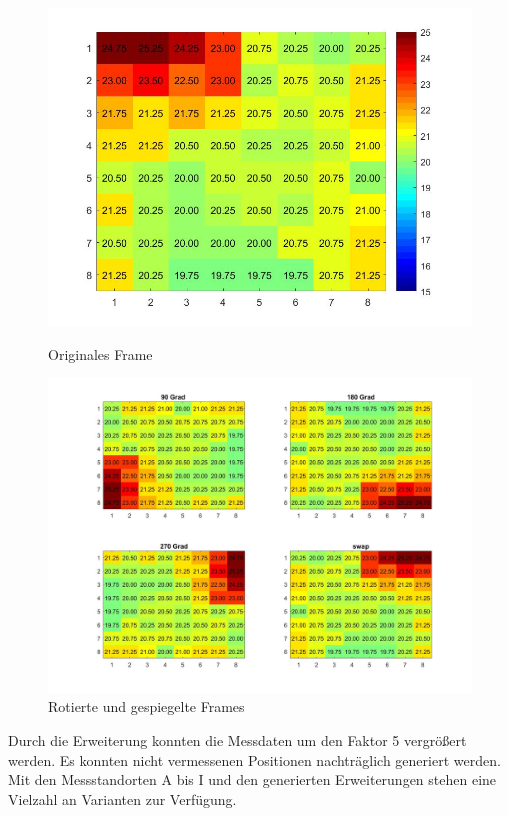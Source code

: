 \begin{figure}[!ht]
	\centering
	\begin{minipage}[c]{0.35\linewidth}
	\centering
	\includegraphics[width=.8\linewidth]{fig/original}
	\caption{Originales Frame}
	\label{fig:original}
	\end{minipage}
	\hfill
	\begin{minipage}[c]{0.6\linewidth  }
\includegraphics[width=1\linewidth]{fig/rotated}
\caption{Rotierte und gespiegelte Frames}
\label{fig:rotated}
	\end{minipage}
\end{figure}


Durch die Erweiterung konnten die Messdaten um den Faktor 5 vergrößert werden. Es konnten nicht vermessenen Positionen nachträglich generiert werden. Mit den Messstandorten A bis I und den generierten Erweiterungen stehen eine Vielzahl an Varianten zur Verfügung. 


